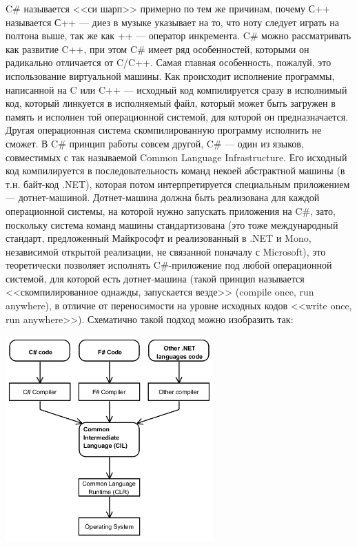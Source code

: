 \documentclass{../../text-style}
\begin{document}
C\# называется <<си шарп>> примерно по тем же причинам, почему С++ называется С++ --- диез в музыке указывает на то, что ноту следует играть на полтона выше, так же как ++ --- оператор инкремента. C\# можно рассматривать как развитие C++, при этом C\# имеет ряд особенностей, которыми он радикально отличается от C/C++. Самая главная особенность, пожалуй, это использование виртуальной машины. Как происходит исполнение программы, написанной на C или C++ --- исходный код компилируется сразу в исполнимый код, который линкуется в исполняемый файл, который может быть загружен в память и исполнен той операционной системой, для которой он предназначается. Другая операционная система скомпилированную программу исполнить не сможет. В C\# принцип работы совсем другой, C\# --- один из языков, совместимых с так называемой Common Language Infrastructure. Его исходный код компилируется в последовательность команд некоей абстрактной машины (в т.н. байт-код .NET), которая потом интерпретируется специальным приложением --- дотнет-машиной. Дотнет-машина должна быть реализована для каждой операционной системы, на которой нужно запускать приложения на C\#, зато, поскольку система команд машины стандартизована (это тоже международный стандарт, предложенный Майкрософт и реализованный в .NET и Mono, независимой открытой реализации, не связанной поначалу с Microsoft), это теоретически позволяет исполнять C\#-приложение под любой операционной системой, для которой есть дотнет-машина (такой принцип называется <<скомпилированное однажды, запускается везде>> (compile once, run anywhere), в отличие от переносимости на уровне исходных кодов <<write once, run anywhere>>). Схематично такой подход можно изобразить так:

\begin{center}
    \includegraphics[width=0.6\textwidth]{cli.png}
\end{center}
\end{document}
